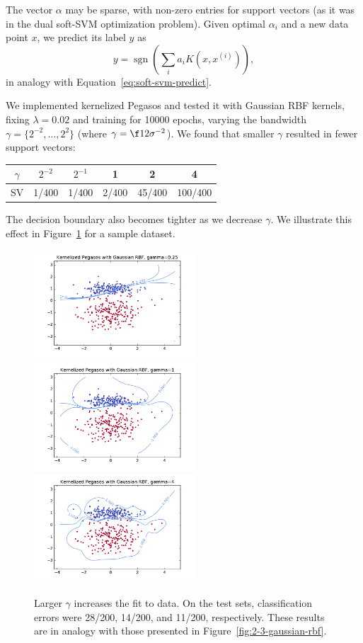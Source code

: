 \documentclass{article}
\DeclareMathOperator{\sgn}{sgn}
\begin{document}
\begin{multicols}{2}
The vector $\alpha$ may be sparse,
with non-zero entries for support vectors
(as it was in the dual soft-SVM optimization problem).
Given optimal $\alpha_i$ and a new data point $x$,
we predict its label $y$ as
\begin{equation}
    y = \sgn\left(\sum_i{a_i K(x,x^{(i)})}\right),
\end{equation}
in analogy with Equation~\ref{eq:soft-svm-predict}.

We implemented kernelized Pegasos
and tested it with Gaussian RBF kernels,
fixing $\lambda = 0.02$ and training for 10000 epochs,
varying the bandwidth $\gamma = \{2^{-2},\dots,2^2\}$
(where $\gamma = \f12\sigma^{-2}$).
We found that smaller $\gamma$ resulted in fewer support vectors:
\begin{center}
    \begin{tabular}{|c||c|c|c|c|c|}
    \hline
    $\gamma$ & $2^{-2}$ & $2^{-1}$ & 1 & 2 & 4\\ \hline
    SV & 1/400 & 1/400 & 2/400 & 45/400 & 100/400 \\ \hline
    \end{tabular}
\end{center}
The decision boundary also becomes tighter as we decrease $\gamma$.
We illustrate this effect in Figure~\ref{fig:3-3-gamma} for a sample dataset.

\begin{figure}[t]
    \centering
	\includegraphics[width=2.4in]{img/3-2-margins/3-3-kernel-025.pdf}
	\includegraphics[width=2.4in]{img/3-2-margins/3-3-kernel-1.pdf}
	\includegraphics[width=2.4in]{img/3-2-margins/3-3-kernel-4.pdf}
    \caption{Larger $\gamma$ increases the fit to data.
       On the test sets,
       classification errors were 28/200, 14/200, and 11/200, respectively.
       These results are in analogy
       with those presented in Figure~\ref{fig:2-3-gaussian-rbf}.
    }
    \label{fig:3-3-gamma}
\end{figure}



\end{multicols}
\end{document}
